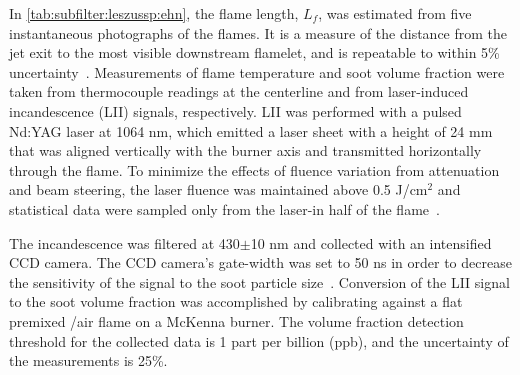 In \cref{tab:subfilter:leszussp:ehn}, the flame length, $L_f$, was estimated from five instantaneous photographs of the flames. It is a measure of the distance from the jet exit to the most visible downstream flamelet, and is repeatable to within 5\% uncertainty~\cite{mahmoud2017}. Measurements of flame temperature and soot volume fraction were taken from thermocouple readings at the centerline and from laser-induced incandescence (LII) signals, respectively. LII was performed with a pulsed Nd:YAG laser at 1064 nm, which emitted a laser sheet with a height of 24 mm that was aligned vertically with the burner axis and transmitted horizontally through the flame. To minimize the effects of fluence variation from attenuation and beam steering, the laser fluence was maintained above 0.5 J/cm$^2$ and statistical data were sampled only from the laser-in half of the flame~\cite{mahmoud2017,sun2015}.

The incandescence was filtered at 430$\pm$10 nm and collected with an intensified CCD camera. The CCD camera's gate-width was set to 50 ns in order to decrease the sensitivity of the signal to the soot particle size~\cite{vanderwal1996,mahmoud2017}. Conversion of the LII signal to the soot volume fraction was accomplished by calibrating against a flat premixed /air flame on a McKenna burner. The volume fraction detection threshold for the collected data is 1 part per billion (ppb), and the uncertainty of the measurements is 25\%.

